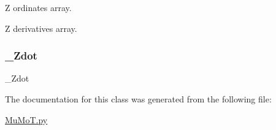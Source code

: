 Z ordinates array. 

Z derivatives array. \mbox{\label{class_mu_mo_t_1_1_mu_mo_tfield_view_a4008c2e6651cb1bf1c9c1af3e962a25d}} 
\subsubsection{\texorpdfstring{\+\_\+\+Zdot}{\_Zdot}}
{\footnotesize\ttfamily \+\_\+\+Zdot\hspace{0.3cm}{\ttfamily [private]}}



The documentation for this class was generated from the following file\+:\begin{DoxyCompactItemize}
\item 
\hyperlink{_mu_mo_t_8py}{Mu\+Mo\+T.\+py}\end{DoxyCompactItemize}
